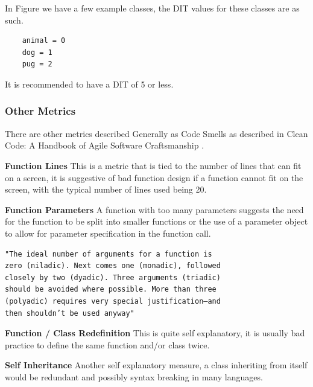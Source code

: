 In Figure  we have a few example classes, the DIT values for these classes are as such.

\begin{verbatim}
    animal = 0
    dog = 1
    pug = 2
\end{verbatim}

It is recommended to have a DIT of 5 or less. \cite{classDesignMetrics}

\subsubsection{\textbf{Other Metrics}}
There are other metrics described Generally as Code Smells as described in Clean Code: A Handbook of Agile Software Craftsmanship \cite{cleanCode}.

\textbf{Function Lines}
This is a metric that is tied to the number of lines that can fit on a screen, it is suggestive of bad function design if a function cannot
fit on the screen, with the typical number of lines used being 20.

\textbf{Function Parameters}
A function with too many parameters suggests the need for the function to be split into smaller functions or the use of a parameter object
to allow for parameter specification in the function call.
\begin{verbatim}
"The ideal number of arguments for a function is
zero (niladic). Next comes one (monadic), followed
closely by two (dyadic). Three arguments (triadic)
should be avoided where possible. More than three
(polyadic) requires very special justification—and
then shouldn’t be used anyway"
\end{verbatim} \cite{cleanCode}

\textbf{Function / Class Redefinition}
This is quite self explanatory, it is usually bad practice to define the same function and/or class twice.

\textbf{Self Inheritance}
Another self explanatory measure, a class inheriting from itself would be redundant and possibly syntax breaking in many languages.


